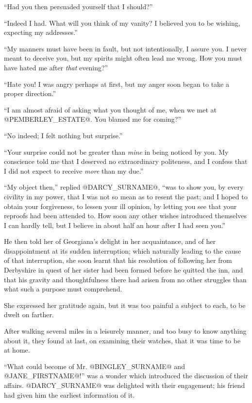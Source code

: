 ``Had you then persuaded yourself that I should?''

``Indeed I had. What will you think of my vanity? I believed you to be
wishing, expecting my addresses.''

``My manners must have been in fault, but not intentionally, I assure
you. I never meant to deceive you, but my spirits might often lead me
wrong. How you must have hated me after \textit{that} evening?''

``Hate you! I was angry perhaps at first, but my anger soon began to take
a proper direction.''

``I am almost afraid of asking what you thought of me, when we met at
@PEMBERLEY_ESTATE@. You blamed me for coming?''

``No indeed; I felt nothing but surprise.''

``Your surprise could not be greater than \textit{mine} in being noticed by you.
My conscience told me that I deserved no extraordinary politeness, and I
confess that I did not expect to receive \textit{more} than my due.''

``My object then,'' replied @DARCY_SURNAME@, ``was to show you, by every civility in
my power, that I was not so mean as to resent the past; and I hoped to
obtain your forgiveness, to lessen your ill opinion, by letting you
see that your reproofs had been attended to. How soon any other wishes
introduced themselves I can hardly tell, but I believe in about half an
hour after I had seen you.''

He then told her of Georgiana's delight in her acquaintance, and of her
disappointment at its sudden interruption; which naturally leading to
the cause of that interruption, she soon learnt that his resolution of
following her from Derbyshire in quest of her sister had been formed
before he quitted the inn, and that his gravity and thoughtfulness
there had arisen from no other struggles than what such a purpose must
comprehend.

She expressed her gratitude again, but it was too painful a subject to
each, to be dwelt on farther.

After walking several miles in a leisurely manner, and too busy to know
anything about it, they found at last, on examining their watches, that
it was time to be at home.

``What could become of Mr. @BINGLEY_SURNAME@ and @JANE_FIRSTNAME@!'' was a wonder which
introduced the discussion of their affairs. @DARCY_SURNAME@ was delighted with
their engagement; his friend had given him the earliest information of
it.

